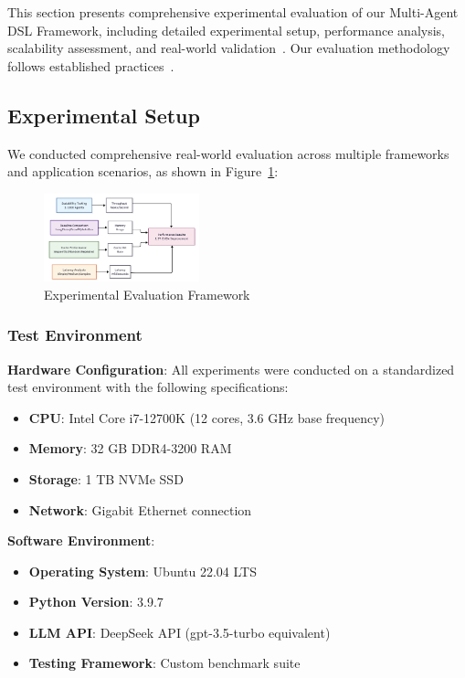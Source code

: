 \documentclass[conference]{IEEEtran}
\begin{document}
This section presents comprehensive experimental evaluation of our Multi-Agent DSL Framework, including detailed experimental setup, performance analysis, scalability assessment, and real-world validation~\cite{custom_benchmark2021,agent_sim2022,coulouris2011distributed}. Our evaluation methodology follows established practices~\cite{tanenbaum2007distributed,lamport2019distributed}.

\subsection{Experimental Setup}

We conducted comprehensive real-world evaluation across multiple frameworks and application scenarios, as shown in Figure~\ref{fig:experimental}:

\begin{figure}[htbp]
\centering
\includegraphics[width=0.4\textwidth]{images/experimental_evaluation_framework.png}
\caption{Experimental Evaluation Framework}
\label{fig:experimental}
\end{figure}

\subsubsection{Test Environment}

\textbf{Hardware Configuration}: All experiments were conducted on a standardized test environment with the following specifications:
\begin{itemize}
\item \textbf{CPU}: Intel Core i7-12700K (12 cores, 3.6 GHz base frequency)
\item \textbf{Memory}: 32 GB DDR4-3200 RAM
\item \textbf{Storage}: 1 TB NVMe SSD
\item \textbf{Network}: Gigabit Ethernet connection
\end{itemize}

\textbf{Software Environment}: 
\begin{itemize}
\item \textbf{Operating System}: Ubuntu 22.04 LTS
\item \textbf{Python Version}: 3.9.7
\item \textbf{LLM API}: DeepSeek API (gpt-3.5-turbo equivalent)
\item \textbf{Testing Framework}: Custom benchmark suite
\end{itemize}
\end{document}
